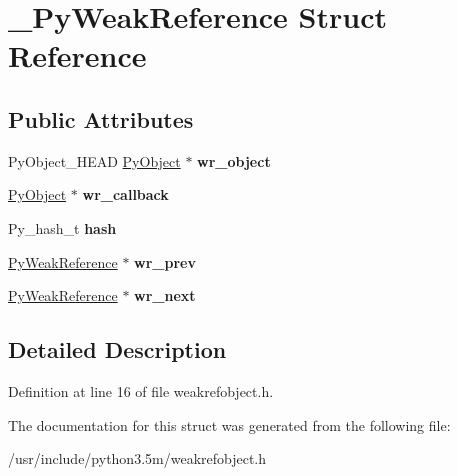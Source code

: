 \hypertarget{struct__PyWeakReference}{}\section{\+\_\+\+Py\+Weak\+Reference Struct Reference}
\label{struct__PyWeakReference}
\subsection*{Public Attributes}
\begin{DoxyCompactItemize}
\item 
Py\+Object\+\_\+\+H\+E\+AD \hyperlink{struct__object}{Py\+Object} $\ast$ {\bfseries wr\+\_\+object}\hypertarget{struct__PyWeakReference_a7a8c9bd3258c64957e04f9104268ae88}{}\label{struct__PyWeakReference_a7a8c9bd3258c64957e04f9104268ae88}

\item 
\hyperlink{struct__object}{Py\+Object} $\ast$ {\bfseries wr\+\_\+callback}\hypertarget{struct__PyWeakReference_a29e417c1f334eae9241f47b20c4749b4}{}\label{struct__PyWeakReference_a29e417c1f334eae9241f47b20c4749b4}

\item 
Py\+\_\+hash\+\_\+t {\bfseries hash}\hypertarget{struct__PyWeakReference_aa679afca366e7ea6e690e10dfabfd804}{}\label{struct__PyWeakReference_aa679afca366e7ea6e690e10dfabfd804}

\item 
\hyperlink{struct__PyWeakReference}{Py\+Weak\+Reference} $\ast$ {\bfseries wr\+\_\+prev}\hypertarget{struct__PyWeakReference_a437c4c0b40ca4b8c011795c49351eacd}{}\label{struct__PyWeakReference_a437c4c0b40ca4b8c011795c49351eacd}

\item 
\hyperlink{struct__PyWeakReference}{Py\+Weak\+Reference} $\ast$ {\bfseries wr\+\_\+next}\hypertarget{struct__PyWeakReference_ac301935218d7aebcf18f107ca4f1b894}{}\label{struct__PyWeakReference_ac301935218d7aebcf18f107ca4f1b894}

\end{DoxyCompactItemize}


\subsection{Detailed Description}


Definition at line 16 of file weakrefobject.\+h.



The documentation for this struct was generated from the following file\+:\begin{DoxyCompactItemize}
\item 
/usr/include/python3.\+5m/weakrefobject.\+h\end{DoxyCompactItemize}
